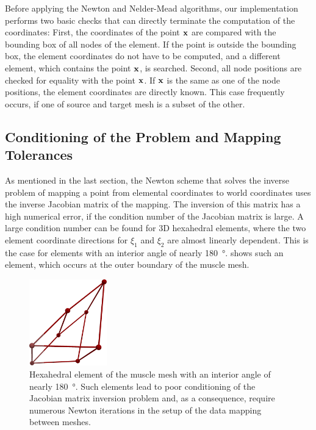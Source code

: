 Before applying the Newton and Nelder-Mead algorithms, our implementation performs two basic checks that can directly terminate the computation of the coordinates: First, the coordinates of the point $\textbf{x}$ are compared with the bounding box of all nodes of the element. If the point is outside the bounding box, the element coordinates do not have to be computed, and a different element, which contains the point $\textbf{x}$, is searched. Second, all node positions are checked for equality with the point $\textbf{x}$. If $\textbf{x}$ is the same as one of the node positions, the element coordinates are directly known. This case frequently occurs, if one of source and target mesh is a subset of the other.

\subsection{Conditioning of the Problem and Mapping Tolerances}

As mentioned in the last section, the Newton scheme that solves the inverse problem of mapping a point from elemental coordinates to world coordinates uses the inverse Jacobian matrix of the mapping. The inversion of this matrix has a high numerical error, if the condition number of the Jacobian matrix is large. A large condition number can be found for 3D hexahedral elements, where the two element coordinate directions for $\xi_1$ and $\xi_2$ are almost linearly dependent. This is the case for elements with an interior angle of nearly \SI{180}{\degree}.  shows such an element, which occurs at the outer boundary of the muscle mesh.

\begin{figure}%
  \centering%
  \includegraphics[width=0.3\textwidth]{images/implementation/bad_element2.png}%
  \caption{Hexahedral element of the muscle mesh with an interior angle of nearly \SI{180}{\degree}. Such elements lead to poor conditioning of the Jacobian matrix inversion problem and, as a consequence, require numerous Newton iterations in the setup of the data mapping between meshes.}%
  \label{fig:bad_element}%
\end{figure}%

